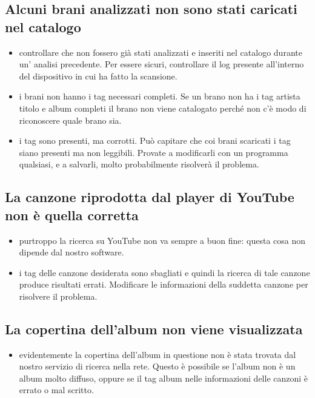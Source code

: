\subsection*{Alcuni brani analizzati non sono stati caricati nel catalogo}
\begin{itemize}
  \item controllare che non fossero gi\`a stati analizzati e inseriti nel
  catalogo durante un' analisi precedente. Per essere sicuri, controllare il log
  presente all'interno del dispositivo in cui  ha fatto la scansione.
  \item i brani non hanno i tag necessari completi. Se un brano non ha i
  tag artista titolo e album completi il brano non viene catalogato perch\'e non
  c'\`e modo di riconoscere quale brano sia.
  \item i tag sono presenti, ma corrotti. Pu\`o capitare che coi brani scaricati i tag
  siano presenti ma non leggibili. Provate a modificarli con un programma qualsiasi, e 
  a salvarli, molto probabilmente risolver\`a il problema.
\end{itemize}

\subsection*{La canzone riprodotta dal player di YouTube non \`e quella
corretta}
\begin{itemize}
  \item purtroppo la ricerca su YouTube non va sempre a buon fine: questa cosa
  non dipende dal nostro software.
  \item i tag delle canzone desiderata sono sbagliati e quindi la
  ricerca di tale canzone produce risultati errati. Modificare le informazioni
  della suddetta canzone per risolvere il problema.
\end{itemize}

\subsection*{La copertina dell'album non viene visualizzata}
\begin{itemize}
  \item evidentemente la copertina dell'album in questione non \`e stata
  trovata dal nostro servizio di ricerca nella rete. Questo \`e possibile se
  l'album non \`e un album molto diffuso, oppure se il tag album nelle
  informazioni delle canzoni \`e errato o mal scritto.
\end{itemize}

